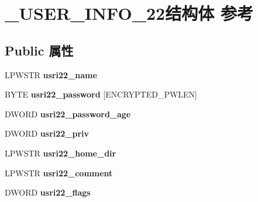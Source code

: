 \hypertarget{struct___u_s_e_r___i_n_f_o__22}{}\section{\+\_\+\+U\+S\+E\+R\+\_\+\+I\+N\+F\+O\+\_\+22结构体 参考}
\label{struct___u_s_e_r___i_n_f_o__22}
\subsection*{Public 属性}
\begin{DoxyCompactItemize}
\item 
\mbox{\label{struct___u_s_e_r___i_n_f_o__22_ab203aa58218fb8798d77862d50a203e4}} 
L\+P\+W\+S\+TR {\bfseries usri22\+\_\+name}
\item 
\mbox{\label{struct___u_s_e_r___i_n_f_o__22_ad1a5b547528bf4abb56e7f6d2656bb2c}} 
B\+Y\+TE {\bfseries usri22\+\_\+password} \mbox{[}E\+N\+C\+R\+Y\+P\+T\+E\+D\+\_\+\+P\+W\+L\+EN\mbox{]}
\item 
\mbox{\label{struct___u_s_e_r___i_n_f_o__22_a1a35a477ad2972be6fd669f65f499bba}} 
D\+W\+O\+RD {\bfseries usri22\+\_\+password\+\_\+age}
\item 
\mbox{\label{struct___u_s_e_r___i_n_f_o__22_a6b79f82b43327468610334797c6b830f}} 
D\+W\+O\+RD {\bfseries usri22\+\_\+priv}
\item 
\mbox{\label{struct___u_s_e_r___i_n_f_o__22_aa9c3e1c1403295ad5d625903d2d61acc}} 
L\+P\+W\+S\+TR {\bfseries usri22\+\_\+home\+\_\+dir}
\item 
\mbox{\label{struct___u_s_e_r___i_n_f_o__22_a8595e0c177fc968089de368292a0ef2d}} 
L\+P\+W\+S\+TR {\bfseries usri22\+\_\+comment}
\item 
\mbox{\label{struct___u_s_e_r___i_n_f_o__22_a037cc997ef4afb5a67b545dac297ae62}} 
D\+W\+O\+RD {\bfseries usri22\+\_\+flags}
\item 
\mbox{\label{struct___u_s_e_r___i_n_f_o__22_a290fcc3fda84c1d598e48370ee6e7d21}} 

\end{DoxyCompactItemize}
